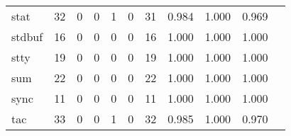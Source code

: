 \begin{longtable}{lp{1.2cm}p{1.2cm}p{1.2cm}p{1.2cm}p{1.2cm}p{1.2cm}p{1.2cm}p{1.2cm}p{1.2cm}p{1.2cm}}
stat      &                                    32 &                                                  0 &                                                  0 &                                                  1 &                                                  0 &                                                 31 &                                         0.984 &                                              1.000 &                                              0.969 \\
stdbuf    &                                    16 &                                                  0 &                                                  0 &                                                  0 &                                                  0 &                                                 16 &                                         1.000 &                                              1.000 &                                              1.000 \\
stty      &                                    19 &                                                  0 &                                                  0 &                                                  0 &                                                  0 &                                                 19 &                                         1.000 &                                              1.000 &                                              1.000 \\
sum       &                                    22 &                                                  0 &                                                  0 &                                                  0 &                                                  0 &                                                 22 &                                         1.000 &                                              1.000 &                                              1.000 \\
sync      &                                    11 &                                                  0 &                                                  0 &                                                  0 &                                                  0 &                                                 11 &                                         1.000 &                                              1.000 &                                              1.000 \\
tac       &                                    33 &                                                  0 &                                                  0 &                                                  1 &                                                  0 &                                                 32 &                                         0.985 &                                              1.000 &                                              0.970 \\

\end{longtable}
